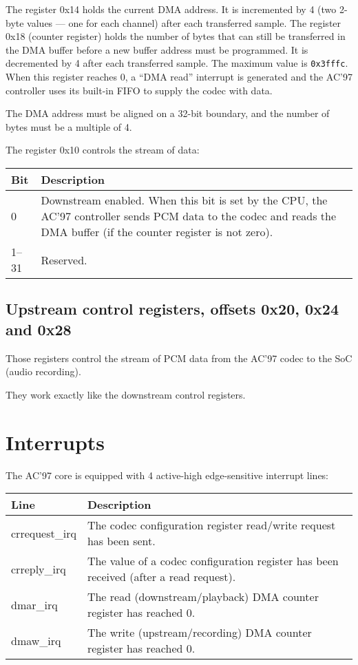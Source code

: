 \documentclass[a4paper,11pt]{article}
\begin{document}
The register 0x14 holds the current DMA address. It is incremented by 4 (two 2-byte values --- one for each channel) after each transferred sample.
The register 0x18 (counter register) holds the number of bytes that can still be transferred in the DMA buffer before a new buffer address must be programmed. It is decremented by 4 after each transferred sample. The maximum value is \verb!0x3fffc!. When this register reaches 0, a ``DMA read'' interrupt is generated and the AC'97 controller uses its built-in FIFO to supply the codec with data.

The DMA address must be aligned on a 32-bit boundary, and the number of bytes must be a multiple of 4.

The register 0x10 controls the stream of data:

\begin{tabularx}{\textwidth}{|l|X|}
\hline
\textbf{Bit} & \textbf{Description} \\
\hline
0 & Downstream enabled. When this bit is set by the CPU, the AC'97 controller sends PCM data to the codec and reads the DMA buffer (if the counter register is not zero). \\
\hline
1--31 & Reserved. \\
\hline
\end{tabularx}

\subsection{Upstream control registers, offsets 0x20, 0x24 and 0x28}
Those registers control the stream of PCM data from the AC'97 codec to the SoC (audio recording).

They work exactly like the downstream control registers.

\section{Interrupts}
The AC'97 core is equipped with 4 active-high edge-sensitive interrupt lines:

\begin{tabularx}{\textwidth}{|l|X|}
\hline
\textbf{Line} & \textbf{Description} \\
\hline
crrequest\_irq & The codec configuration register read/write request has been sent. \\
\hline
crreply\_irq & The value of a codec configuration register has been received (after a read request). \\
\hline
dmar\_irq & The read (downstream/playback) DMA counter register has reached 0. \\
\hline
dmaw\_irq & The write (upstream/recording) DMA counter register has reached 0. \\
\hline
\end{tabularx}
\end{document}
